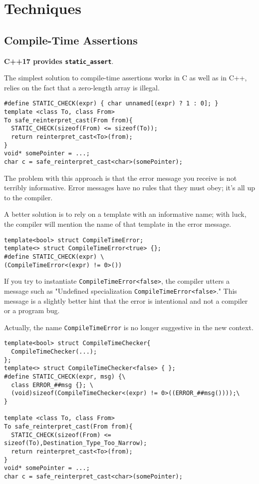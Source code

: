 \newpage
\section{Techniques}

\subsection{Compile-Time Assertions}

\textbf{C++17 provides \texttt{static\_assert}}.

The simplest solution to compile-time assertions works in C as well as in
C++, relies on the fact that a zero-length array is illegal.

\begin{verbatim}
#define STATIC_CHECK(expr) { char unnamed[(expr) ? 1 : 0]; }
template <class To, class From>
To safe_reinterpret_cast(From from){
  STATIC_CHECK(sizeof(From) <= sizeof(To));
  return reinterpret_cast<To>(from);
}
void* somePointer = ...;
char c = safe_reinterpret_cast<char>(somePointer);
\end{verbatim}

The problem with this approach is that the error message you receive
is not terribly informative. Error messages have no rules that they
must obey; it's all up to the compiler.

A better solution is to rely on a template with an informative name;
with luck, the compiler will mention the name of that template in the
error message.

\begin{verbatim}
template<bool> struct CompileTimeError;
template<> struct CompileTimeError<true> {};
#define STATIC_CHECK(expr) \
(CompileTimeError<(expr) != 0>())
\end{verbatim}

If you try to instantiate
\texttt{CompileTimeError<false>}, the compiler utters a message such
as "Undefined specialization \texttt{CompileTimeError<false>}." This
message is a slightly better hint that the error is intentional and
not a compiler or a program bug.

Actually, the name \texttt{CompileTimeError} is no longer suggestive
in the new context.

\begin{verbatim}
template<bool> struct CompileTimeChecker{
  CompileTimeChecker(...);
};
template<> struct CompileTimeChecker<false> { };
#define STATIC_CHECK(expr, msg) {\
  class ERROR_##msg {}; \
  (void)sizeof(CompileTimeChecker<(expr) != 0>((ERROR_##msg())));\
}

template <class To, class From>
To safe_reinterpret_cast(From from){
  STATIC_CHECK(sizeof(From) <= sizeof(To),Destination_Type_Too_Narrow);
  return reinterpret_cast<To>(from);
}
void* somePointer = ...;
char c = safe_reinterpret_cast<char>(somePointer);
\end{verbatim}

